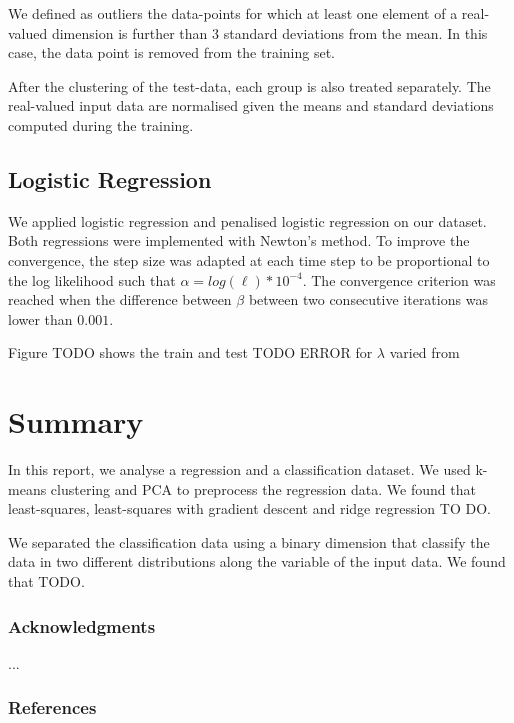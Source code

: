 \documentclass{article} %
\begin{document}
We defined as outliers the data-points for which at least one element of a real-valued dimension is further than 3 standard deviations from the mean. In this case, the data point is removed from the training set. 

After the clustering of the test-data, each group is also treated separately. The real-valued input data are normalised given the means and standard deviations computed during the training.

\subsection{Logistic Regression}
We applied logistic regression and penalised logistic regression on our dataset. Both regressions were implemented with Newton's method. To improve the convergence, the step size was adapted at each time step to be proportional to the log likelihood such that $\alpha = log(\ell) * 10^{-4}$. The convergence criterion was reached when the difference between $\beta$ between two consecutive iterations was lower than $0.001$.

Figure TODO shows the train and test TODO ERROR for $\lambda$ varied from

\section{Summary}
In this report, we analyse a regression and a classification dataset. We used k-means clustering and PCA to preprocess the regression data. We found that least-squares, least-squares with gradient descent and ridge regression TO DO.

We separated the classification data using a binary dimension that classify the data in two different distributions along the variable of the input data. We found that TODO.


\subsubsection*{Acknowledgments}
...

\subsubsection*{References}
\end{document}
